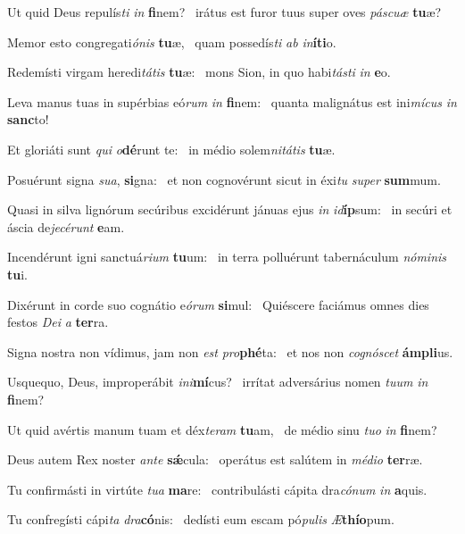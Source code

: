 \item Ut quid Deus repulís\textit{ti} \textit{in} \textbf{fi}nem?~\psstar{} irátus est furor tuus super oves \textit{páscuæ} \textbf{tu}æ?
\item Memor esto congregati\textit{ónis} \textbf{tu}æ,~\psstar{} quam possedís\textit{ti} \textit{ab} \textit{in}\textbf{í}\textbf{ti}o.
\item Redemísti virgam heredi\textit{tátis} \textbf{tu}æ:~\psstar{} mons Sion, in quo habi\textit{tásti} \textit{in} \textbf{e}o.
\item Leva manus tuas in supérbias eó\textit{rum} \textit{in} \textbf{fi}nem:~\psstar{} quanta malignátus est ini\textit{mícus} \textit{in} \textbf{sanc}to!
\item Et gloriáti sunt \textit{qui} \textit{o}\textbf{dé}runt te:~\psstar{} in médio solem\textit{nitátis} \textbf{tu}æ.
\item Posuérunt signa \textit{sua}, \textbf{si}gna:~\psstar{} et non cognovérunt sicut in éxi\textit{tu} \textit{super} \textbf{sum}mum.
\item Quasi in silva lignórum secúribus excidérunt jánuas ejus \textit{in} \textit{id}\textbf{íp}sum:~\psstar{} in secúri et áscia de\textit{jecérunt} \textbf{e}am.
\item Incendérunt igni sanctuá\textit{rium} \textbf{tu}um:~\psstar{} in terra polluérunt tabernáculum \textit{nóminis} \textbf{tu}i.
\item Dixérunt in corde suo cognátio e\textit{órum} \textbf{si}mul:~\psstar{} Quiéscere faciámus omnes dies festos \textit{Dei} \textit{a} \textbf{ter}ra.
\item Signa nostra non vídimus, jam non \textit{est} \textit{pro}\textbf{phé}ta:~\psstar{} et nos non \textit{cognóscet} \textbf{ám}\textbf{pli}us.
\item Usquequo, Deus, improperábit \textit{ini}\textbf{mí}cus?~\psstar{} irrítat adversárius nomen \textit{tuum} \textit{in} \textbf{fi}nem?
\item Ut quid avértis manum tuam et déx\textit{teram} \textbf{tu}am,~\psstar{} de médio sinu \textit{tuo} \textit{in} \textbf{fi}nem?
\item Deus autem Rex noster \textit{ante} \textbf{sǽ}cula:~\psstar{} operátus est salútem in \textit{médio} \textbf{ter}ræ.
\item Tu confirmásti in virtúte \textit{tua} \textbf{ma}re:~\psstar{} contribulásti cápita dra\textit{cónum} \textit{in} \textbf{a}quis.
\item Tu confregísti cápi\textit{ta} \textit{dra}\-\textbf{có}\-nis:~\psstar{} dedísti eum escam pó\textit{pulis} \textit{Æ}\textbf{thí}\textbf{o}pum.
